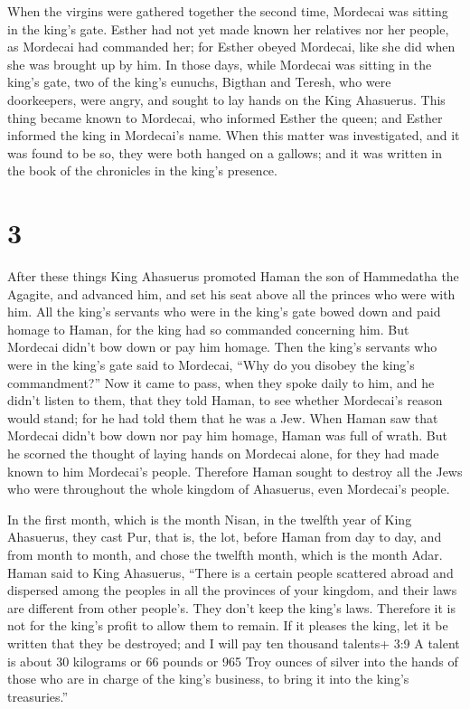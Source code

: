  When the virgins were gathered together the second time,
Mordecai was sitting in the king's gate.  Esther had not
yet made known her relatives nor her people, as Mordecai had commanded
her; for Esther obeyed Mordecai, like she did when she was brought up by
him.  In those days, while Mordecai was sitting in the
king's gate, two of the king's eunuchs, Bigthan and Teresh, who were
doorkeepers, were angry, and sought to lay hands on the King Ahasuerus.
 This thing became known to Mordecai, who informed Esther
the queen; and Esther informed the king in Mordecai's name.
 When this matter was investigated, and it was found to be
so, they were both hanged on a gallows; and it was written in the book
of the chronicles in the king's presence.

\hypertarget{section-2}{%
\section{3}\label{section-2}}

 After these things King Ahasuerus promoted Haman the son of
Hammedatha the Agagite, and advanced him, and set his seat above all the
princes who were with him.  All the king's servants who were
in the king's gate bowed down and paid homage to Haman, for the king had
so commanded concerning him. But Mordecai didn't bow down or pay him
homage.  Then the king's servants who were in the king's
gate said to Mordecai, ``Why do you disobey the king's commandment?''
 Now it came to pass, when they spoke daily to him, and he
didn't listen to them, that they told Haman, to see whether Mordecai's
reason would stand; for he had told them that he was a Jew. 
When Haman saw that Mordecai didn't bow down nor pay him homage, Haman
was full of wrath.  But he scorned the thought of laying
hands on Mordecai alone, for they had made known to him Mordecai's
people. Therefore Haman sought to destroy all the Jews who were
throughout the whole kingdom of Ahasuerus, even Mordecai's people.

 In the first month, which is the month Nisan, in the
twelfth year of King Ahasuerus, they cast Pur, that is, the lot, before
Haman from day to day, and from month to month, and chose the twelfth
month, which is the month Adar.  Haman said to King
Ahasuerus, ``There is a certain people scattered abroad and dispersed
among the peoples in all the provinces of your kingdom, and their laws
are different from other people's. They don't keep the king's laws.
Therefore it is not for the king's profit to allow them to remain.
 If it pleases the king, let it be written that they be
destroyed; and I will pay ten thousand talents+ 3:9 A talent is about 30
kilograms or 66 pounds or 965 Troy ounces of silver into the hands of
those who are in charge of the king's business, to bring it into the
king's treasuries.''

